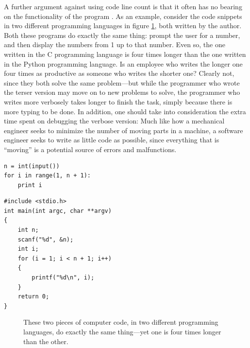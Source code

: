 \documentclass[letterpaper, 10pt]{report}
\begin{document}
A further argument against using code line count is that it often has no bearing on the functionality of the program \parencite{albrechtgaffey:linesofcode}. 
As an example, consider the code snippets in two different programming languages in figure \ref{fig:codelineexample}, both written by the author. 
Both these programs do exactly the same thing: prompt the user for a number, and then display the numbers from 1 up to that number. 
Even so, the one written in the C programming language is four times longer than the one written in the Python programming language. 
Is an employee who writes the longer one four times as productive as someone who writes the shorter one? 
Clearly not, since they both solve the same problem---but while the programmer who wrote the terser version may move on to new problems to solve, the programmer who writes more verbosely takes longer to finish the task, simply because there is more typing to be done. 
In addition, one should take into consideration the extra time spent on debugging the verbose version: 
Much like how a mechanical engineer seeks to minimize the number of moving parts in a machine, a software engineer seeks to write as little code as possible, since everything that is ``moving'' is a potential source of errors and malfunctions. 

\newsavebox{\pythonexample}
\begin{lrbox}{\pythonexample}
\begin{lstlisting}
n = int(input())
for i in range(1, n + 1):
	print i
\end{lstlisting}
\end{lrbox}

\newsavebox{\cexample}
\begin{lrbox}{\cexample}
\begin{lstlisting}
#include <stdio.h>
int main(int argc, char **argv) 
{
	int n;
	scanf("%d", &n);
	int i;
	for (i = 1; i < n + 1; i++) 
	{
		printf("%d\n", i);
	}
	return 0;
}
\end{lstlisting}
\end{lrbox}

\begin{figure}
{\caption{These two pieces of computer code, in two different programming languages, do exactly the same thing---yet one is four times longer than the other.}\label{fig:codelineexample}}
\end{figure}
\end{document}
